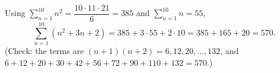 Using $\sum_{n=1}^{10}n^2=\dfrac{10\cdot11\cdot21}{6}=385$ and $\sum_{n=1}^{10}n=55$,
\[\sum_{n=1}^{10}\left(n^2+3n+2\right)=385+3\cdot55+2\cdot10=385+165+20=\boxed{570}.\]
(Check: the terms are $(n+1)(n+2)=6,12,20,\dots,132$, and $6+12+20+30+42+56+72+90+110+132=570$.)
